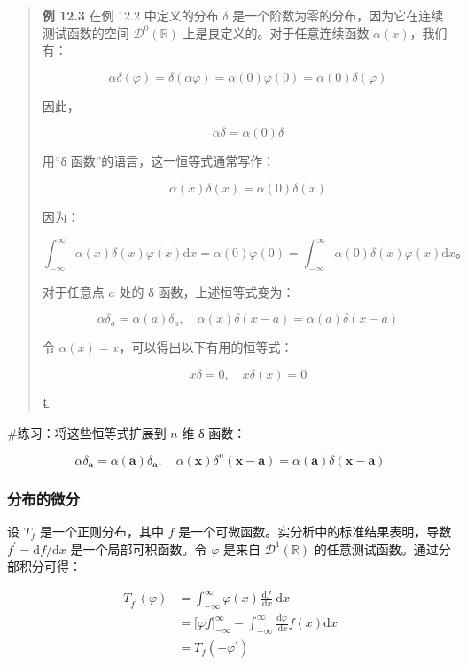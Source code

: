 \begin{quote}
\textbf{例 12.3} 在例 12.2 中定义的分布 \(\delta\)
是一个阶数为零的分布，因为它在连续测试函数的空间
\(\mathcal{D}^{0}\left( \mathbb{R} \right)\)
上是良定义的。对于任意连续函数 \(\alpha(x)\)，我们有：

\[\alpha\delta(\varphi) = \delta(\alpha\varphi) = \alpha(0)\varphi(0) = \alpha(0)\delta(\varphi)\]

因此，

\[\alpha\delta = \alpha(0)\delta\]

用``δ 函数''的语言，这一恒等式通常写作：

\[\alpha(x)\delta(x) = \alpha(0)\delta(x)\]

因为：

\[\int_{- \infty}^{\infty}\alpha(x)\delta(x)\varphi(x)\mathrm{d}x = \alpha(0)\varphi(0) = \int_{- \infty}^{\infty}\alpha(0)\delta(x)\varphi(x)\mathrm{d}x。\]

对于任意点 \(a\) 处的 δ 函数，上述恒等式变为：

\[\alpha\delta_{a} = \alpha(a)\delta_{a},\quad\alpha(x)\delta(x - a) = \alpha(a)\delta(x - a)\]

令 \(\alpha(x) = x\)，可以得出以下有用的恒等式：

\[x\delta = 0,\quad x\delta(x) = 0\]

℄~
\end{quote}

\#练习：将这些恒等式扩展到 \(n\) 维 δ 函数：

\[\alpha\delta_{\mathbf{a}} = \alpha\left( \mathbf{a} \right)\delta_{\mathbf{a}},\quad\alpha\left( \mathbf{x} \right)\delta^{n}\left( \mathbf{x} - \mathbf{a} \right) = \alpha\left( \mathbf{a} \right)\delta\left( \mathbf{x} - \mathbf{a} \right)\]

\subsubsection{分布的微分}\label{ux5206ux5e03ux7684ux5faeux5206}

设 \(T_{f}\) 是一个正则分布，其中 \(f\)
是一个可微函数。实分析中的标准结果表明，导数
\(f^{\prime} = \mathrm{d}f/\mathrm{d}x\) 是一个局部可积函数。令
\(\varphi\) 是来自 \(\mathcal{D}^{1}\left( \mathbb{R} \right)\)
的任意测试函数。通过分部积分可得：

\[\begin{aligned}
T_{f^{\prime}}(\varphi) & = \int_{- \infty}^{\infty}\varphi(x)\frac{\mathrm{d}f}{\mathrm{\: d}x}\mathrm{\: d}x \\
 & = \lbrack\varphi f\rbrack_{- \infty}^{\infty} - \int_{- \infty}^{\infty}\frac{\mathrm{d}\varphi}{\mathrm{\: d}x}f(x)\mathrm{d}x \\
 & = T_{f}\left( - \varphi^{\prime} \right)
\end{aligned}\]

